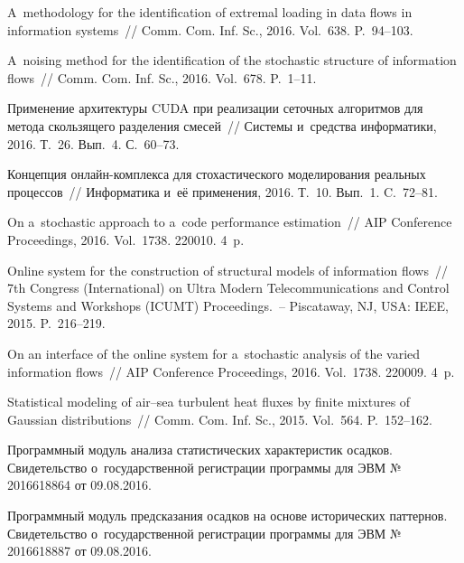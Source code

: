 \begin{multicols}{2}
{{\begin{thebibliography}{99}
 A~methodology for the identification 
of extremal loading in data flows in information systems~// 
Comm. Com. Inf. Sc., 2016. Vol.~638. P.~94--103.

 A~noising method for the identification 
of the stochastic structure of information flows~// Comm. Com. Inf. Sc., 
2016. Vol.~678. P.~1--11.

 Применение архитектуры CUDA 
при реализации сеточных алгоритмов для метода скользящего разделения смесей~// 
Системы и~средства информатики,
2016. Т.~26. Вып.~4. С.~60--73.

 Концепция он\-лайн-комп\-лек\-са 
для стохастического моделирования реальных процессов~// Информатика и~её 
применения, 2016. Т.~10. Вып.~1. C.~72--81.

 On a~stochastic approach to 
a~code performance estimation~// AIP Conference Proceedings, 2016. Vol.~1738. 
220010. 4~p.

 Online system for the construction of structural
 models of information flows~// 7th  Congress (International) on 
 Ultra Modern Telecommunications and Control Systems and Workshops (ICUMT) Proceedings.~-- 
 Piscataway, NJ, USA: IEEE, 2015. P.~216--219.

 On an interface of the online system for 
a~stochastic analysis of the varied information flows~// AIP Conference Proceedings, 
2016. Vol.~1738. 220009. 4~p.

Statistical modeling of air--sea turbulent heat fluxes by finite mixtures of 
Gaussian distributions~// Comm. Com. Inf. Sc., 2015. Vol.~564. P.~152--162.

 Программный модуль анализа статистических характеристик осадков. 
Свидетельство о~государственной регистрации программы для ЭВМ 
№\,2016618864 от 09.08.2016.

  
Программный модуль предсказания осадков на основе исторических паттернов. 
Свидетельство о~государственной регистрации программы для ЭВМ №\,2016618887 
от 09.08.2016.


\end{thebibliography}}}
\end{multicols}
